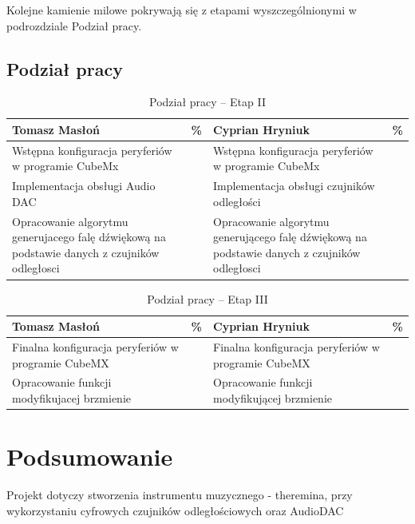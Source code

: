 \documentclass[10pt, a4paper]{article}
\begin{document}
Kolejne kamienie milowe pokrywają się z etapami wyszczególnionymi w podrozdziale Podział pracy.
\subsection{Podział pracy}

\begin{table}[H]
	\centering
	\begin{tabular}{|L{7cm}|L{0.8cm}||L{7cm}|L{0.8cm}|}
		\hline
		\hline
		\textbf{Tomasz Masłoń} & 
		\% & 
		\textbf{Cyprian Hryniuk} & \%\\
		\hline
		\hline
		Wstępna konfiguracja peryferiów w programie CubeMx		& &	
		 	Wstępna konfiguracja peryferiów w programie CubeMx	&\\
		\hline
		Implementacja obsługi Audio DAC & &
		 	Implementacja obsługi czujników odległości&\\
		\hline
		Opracowanie algorytmu generujacego falę dźwiękową na podstawie danych z czujników odległosci & &
		Opracowanie algorytmu generującego falę dźwiękową na podstawie danych z czujników odległosci & \\
		\hline
		\end{tabular}
	\caption{Podział pracy -- Etap II}
	\label{tab:PodzialPracyEtap2}
\end{table}

\begin{table}[H]
	\centering
	\begin{tabular}{|L{7cm}|L{0.8cm}||L{7cm}|L{0.8cm}|}
		\hline
		\hline
		\textbf{Tomasz Masłoń} & 
		\% & 
		\textbf{Cyprian Hryniuk} & \%\\
		\hline
		\hline
		Finalna konfiguracja peryferiów w programie CubeMX		& &	
		Finalna konfiguracja peryferiów w programie CubeMX &\\
		\hline
		Opracowanie funkcji modyfikujacej brzmienie  & &
		Opracowanie funkcji modyfikującej brzmienie &\\
		\hline	
	\end{tabular}
	\caption{Podział pracy -- Etap III}
	\label{tab:PodzialPracyEtap3}
\end{table}


\section{Podsumowanie}
Projekt dotyczy stworzenia instrumentu muzycznego - theremina, przy wykorzystaniu cyfrowych czujników odległościowych oraz AudioDAC

\newpage
{}


\end{document}
